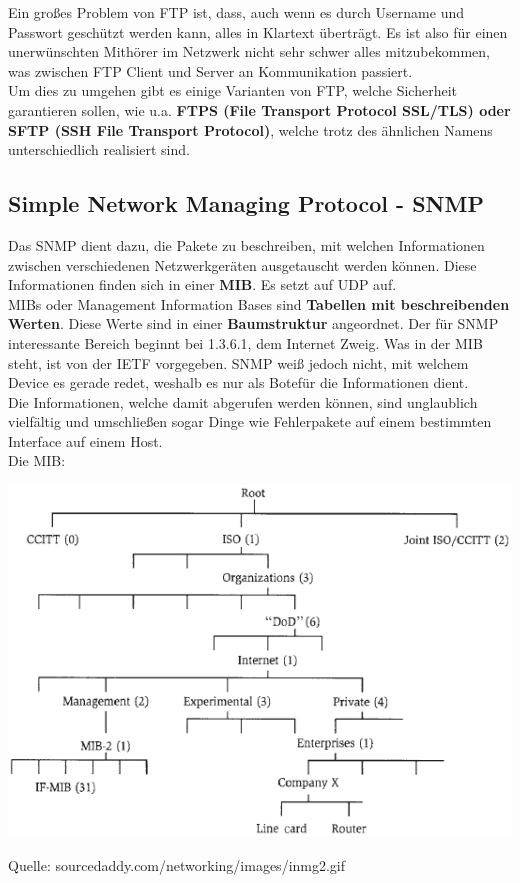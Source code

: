 \documentclass[12pt,a4paper]{report}
\begin{document}
\begin{onehalfspace}
Ein großes Problem von FTP ist, dass, auch wenn es durch Username und Passwort geschützt werden kann, alles in Klartext überträgt. Es ist also für einen unerwünschten Mithörer im Netzwerk nicht sehr schwer alles mitzubekommen, was zwischen FTP Client und Server an Kommunikation passiert.\\
Um dies zu umgehen gibt es einige Varianten von FTP, welche Sicherheit garantieren sollen, wie u.a. \textbf{FTPS (File Transport Protocol SSL/TLS) oder SFTP (SSH File Transport Protocol)}, welche trotz des ähnlichen Namens unterschiedlich realisiert sind. 
 
\subsection{Simple Network Managing Protocol - SNMP}
Das SNMP dient dazu, die Pakete zu beschreiben, mit welchen Informationen zwischen verschiedenen Netzwerkgeräten ausgetauscht werden können. Diese Informationen finden sich in einer \textbf{MIB}. Es setzt auf UDP auf.\\

MIBs oder Management Information Bases sind \textbf{Tabellen mit beschreibenden Werten}. Diese Werte sind in einer \textbf{Baumstruktur} angeordnet. Der für SNMP interessante Bereich beginnt bei 1.3.6.1, dem Internet Zweig. Was in der MIB steht, ist von der IETF vorgegeben. SNMP weiß jedoch nicht, mit welchem Device es gerade redet, weshalb es nur als \glqq Bote\grqq für die Informationen dient.\\
Die Informationen, welche damit abgerufen werden können, sind unglaublich vielfältig und umschließen sogar Dinge wie Fehlerpakete auf einem bestimmten Interface auf einem Host.\\

Die MIB:
\begin{center}
\includegraphics[scale=0.7]{../docs/tarkes/pics/mib.jpg}
\begin{scriptsize}
Quelle: sourcedaddy.com/networking/images/inmg2.gif
\end{scriptsize}
\end{center}


\end{onehalfspace}
\end{document}

